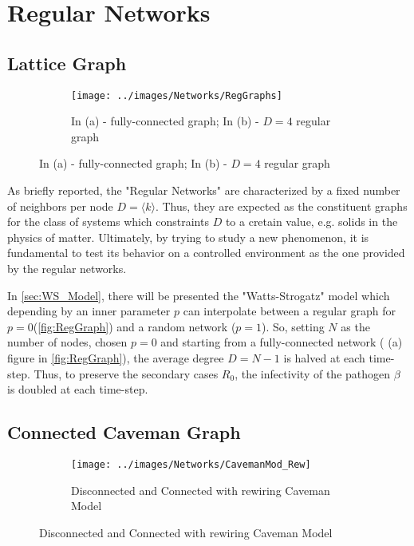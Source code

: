 \documentclass[a4paper,12pt,twoside]{book} %
\theoremstyle{definition}
\begin{document}
\section{Regular Networks}
\subsection{Lattice Graph}
\begin{figure}[ht]
    \begin{subfigure}{\textwidth}
        \texttt{[image: ../images/Networks/RegGraphs]}
        \centering
        \caption{In (a) - fully-connected graph; In (b) - $D = 4$ regular graph \cite{Zelazo:2011_RSensNet_images}}
        \label{fig:RegGraph}
    \end{subfigure}
\end{figure}

As briefly reported, the "Regular Networks" are characterized by a fixed number of neighbors per node $D = \langle k \rangle$. Thus, they are expected as the constituent graphs for the class of systems which constraints $D$ to a cretain value, e.g. solids in the physics of matter.
Ultimately, by trying to study a new phenomenon, it is fundamental to test its behavior on a controlled environment as the one provided by the regular networks.

In \autoref{sec:WS_Model}, there will be presented the "Watts-Strogatz" model which depending by an inner parameter $p$ can interpolate between a regular graph for $p = 0$(\autoref{fig:RegGraph}) and a random network ($p=1$).
So, setting $N$ as the number of nodes, chosen $p=0$ and starting from a fully-connected network ( (a) figure in \autoref{fig:RegGraph}), the average degree $D = N-1$ is halved at each time-step. Thus, to preserve the secondary cases $R_0$, the infectivity of the pathogen $\beta$ is doubled at each time-step.

\subsection{Connected Caveman Graph}
\begin{figure}[ht]
    \begin{subfigure}{\textwidth}
        \texttt{[image: ../images/Networks/CavemanMod\_Rew]}
        \centering
        \caption{Disconnected and Connected with rewiring Caveman Model \cite{Taube:2005_IndianSoftwIndustry}}
        \label{fig:CavemanMod}
    \end{subfigure}
\end{figure}
\end{document}
